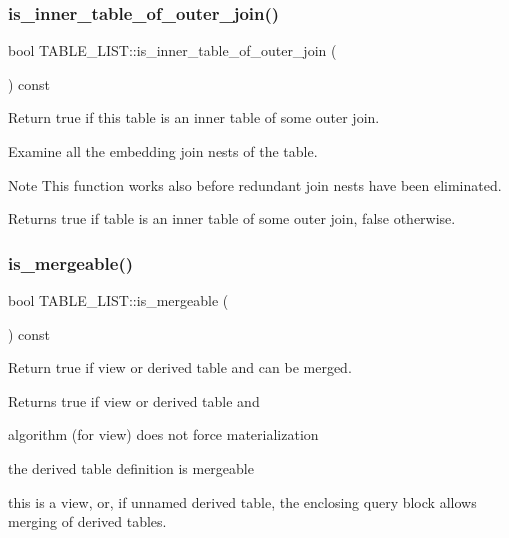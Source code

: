 \subsubsection{\texorpdfstring{is\+\_\+inner\+\_\+table\+\_\+of\+\_\+outer\+\_\+join()}{is\_inner\_table\_of\_outer\_join()}}
{\footnotesize\ttfamily bool T\+A\+B\+L\+E\+\_\+\+L\+I\+S\+T\+::is\+\_\+inner\+\_\+table\+\_\+of\+\_\+outer\+\_\+join (\begin{DoxyParamCaption}{ }\end{DoxyParamCaption}) const\hspace{0.3cm}{\ttfamily [inline]}}

Return true if this table is an inner table of some outer join.

Examine all the embedding join nests of the table. \begin{DoxyNote}{Note}
This function works also before redundant join nests have been eliminated.
\end{DoxyNote}
\begin{DoxyReturn}{Returns}
true if table is an inner table of some outer join, false otherwise. 
\end{DoxyReturn}
\mbox{\label{structTABLE__LIST_a4a2f63ec241cf7b97113d1fbcf4dc18b}} 
\subsubsection{\texorpdfstring{is\+\_\+mergeable()}{is\_mergeable()}}
{\footnotesize\ttfamily bool T\+A\+B\+L\+E\+\_\+\+L\+I\+S\+T\+::is\+\_\+mergeable (\begin{DoxyParamCaption}{ }\end{DoxyParamCaption}) const}



Return true if view or derived table and can be merged. 

\begin{DoxyReturn}{Returns}
true if view or derived table and
\begin{DoxyItemize}
\item algorithm (for view) does not force materialization
\item the derived table definition is mergeable
\item this is a view, or, if unnamed derived table, the enclosing query block allows merging of derived tables. 
\end{DoxyItemize}
\end{DoxyReturn}
\mbox{\label{structTABLE__LIST_a12166730e324a1371da84b8442931586}} 

